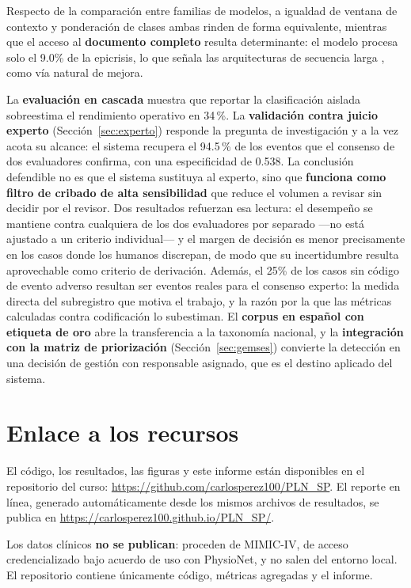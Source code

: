 \documentclass[conference]{IEEEtran}
\begin{document}
Respecto de la comparación entre familias de modelos, a igualdad de ventana de
contexto y ponderación de clases ambas rinden de forma equivalente, mientras
que el acceso al \textbf{documento completo} resulta determinante: el modelo
procesa solo el 9.0\% de la epicrisis, lo que señala las
arquitecturas de secuencia larga \cite{cliniclong}, \cite{longformer} como
vía natural de mejora.

La \textbf{evaluación en cascada} muestra que reportar la clasificación
aislada sobreestima el rendimiento operativo en 34\,\%. La
\textbf{validación contra juicio experto} (Sección~\ref{sec:experto})
responde la pregunta de investigación y a la vez acota su alcance: el sistema
recupera el 94.5\,\% de los eventos que el
consenso de dos evaluadores confirma, con una especificidad de
0.538. La conclusión defendible no es que el sistema
sustituya al experto, sino que \textbf{funciona como filtro de cribado de alta
sensibilidad} que reduce el volumen a revisar sin decidir por el revisor. Dos
resultados refuerzan esa lectura: el desempeño se mantiene contra cualquiera de
los dos evaluadores por separado ---no está ajustado a un criterio
individual--- y el margen de decisión es menor precisamente en los casos donde
los humanos discrepan, de modo que su incertidumbre resulta aprovechable como
criterio de derivación. Además, el 25\% de los casos
sin código de evento adverso resultan ser eventos reales para el consenso
experto: la medida directa del subregistro que motiva el trabajo, y la razón
por la que las métricas calculadas contra codificación lo subestiman. El
\textbf{corpus en español con etiqueta de oro} abre la transferencia a la
taxonomía nacional, y la \textbf{integración con la matriz de priorización}
(Sección~\ref{sec:gemses}) convierte la detección en una decisión de gestión
con responsable asignado, que es el destino aplicado del sistema.

\section*{Enlace a los recursos}
El código, los resultados, las figuras y este informe están disponibles en el
repositorio del curso: \url{https://github.com/carlosperez100/PLN_SP}.
El reporte en línea, generado automáticamente desde los mismos archivos de
resultados, se publica en \url{https://carlosperez100.github.io/PLN_SP/}.

Los datos clínicos \textbf{no se publican}: proceden de MIMIC-IV, de acceso
credencializado bajo acuerdo de uso con PhysioNet, y no salen del entorno
local. El repositorio contiene únicamente código, métricas agregadas y el
informe.
\end{document}
